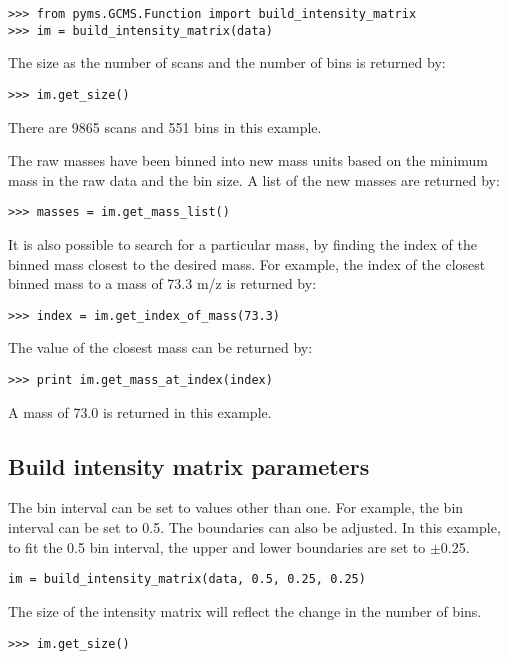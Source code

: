 \begin{verbatim}
>>> from pyms.GCMS.Function import build_intensity_matrix
>>> im = build_intensity_matrix(data)
\end{verbatim}

The size as the number of scans and the number of bins is returned by:
\begin{verbatim}
>>> im.get_size()
\end{verbatim}

There are 9865 scans and 551 bins in this example.

The raw masses have been binned into new mass units based on the minimum mass
in the raw data and the bin size. A list of the new masses are returned by:

\begin{verbatim}
>>> masses = im.get_mass_list()
\end{verbatim}

It is also possible to search for a particular mass, by finding the index of the
binned mass closest to the desired mass. For example, the index of the closest
binned mass to a mass of 73.3 m/z is returned by:

\begin{verbatim}
>>> index = im.get_index_of_mass(73.3)
\end{verbatim}

The value of the closest mass can be returned by:

\begin{verbatim}
>>> print im.get_mass_at_index(index)
\end{verbatim}

A mass of 73.0 is returned in this example.

\subsection{Build intensity matrix parameters}


The bin interval can be set to values other than one. For example, the bin
interval can be set to 0.5. The boundaries can also be adjusted. In this
example, to fit the 0.5 bin interval, the upper and lower boundaries are set to
$\pm$0.25.

\begin{verbatim}
im = build_intensity_matrix(data, 0.5, 0.25, 0.25)
\end{verbatim}

The size of the intensity matrix will reflect the change in the number of bins.
\begin{verbatim}
>>> im.get_size()
\end{verbatim}


